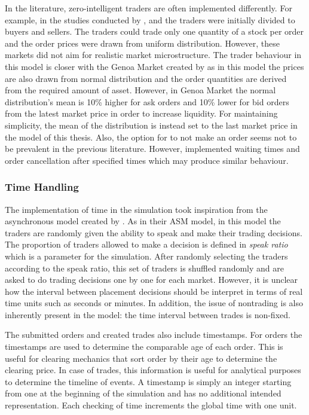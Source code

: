 In the literature, zero-intelligent traders are often implemented differently. For example, in the studies conducted by 
\citet{God93}, \citet{Jam96} and \citet{Mil08} the traders were initially divided to buyers and 
sellers. The traders could trade only one quantity of a stock per order and the order prices 
were drawn from uniform distribution. However, these markets did not aim for 
realistic market microstructure. The trader behaviour in this model is closer with the Genoa Market 
created by \citet{Genoa01} as in this model the prices are also drawn from normal distribution and 
the order quantities are derived from the required amount of asset. However, in Genoa Market the 
normal distribution's mean is 10\% higher for ask orders and 10\% lower for bid orders from the 
latest market price in order to increase liquidity. For maintaining simplicity, the mean of the distribution 
is instead set to the last market price in the model of this thesis. Also, the option for to not make an order 
seems not to be prevalent in the previous literature. However, \citet{Raberto05} implemented waiting times and order 
cancellation after specified times which may produce similar behaviour. 

\subsubsection{Time Handling}

The implementation of time in the simulation took inspiration from the asynchronous model created by \citet{Julien07}. 
As in their ASM model, in this model the traders are randomly given the ability to speak and make 
their trading decisions. The proportion of traders allowed to make a decision is defined in
\textit{speak ratio} which is a parameter for the simulation. After randomly selecting the traders
according to the speak ratio, this set of traders is shuffled randomly and are asked to do trading 
decisions one by one for each market. However, it is unclear how the interval between placement 
decisions should be interpret in terms of real time units such as seconds or minutes. In addition, 
the issue of nontrading is also inherently present in the model: the time interval between trades 
is non-fixed.

The submitted orders and created trades also include timestamps. For orders the timestamps are used
to determine the comparable age of each order. This is useful for clearing mechanics that sort 
order by their age to determine the clearing price. In case of trades, this information
is useful for analytical purposes to determine the timeline of events. A timestamp is simply 
an integer starting from one at the beginning of the simulation and has no additional 
intended representation. Each checking of time increments the global time with one unit.

